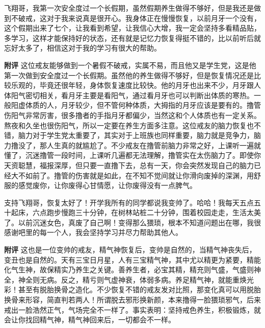 \begin{case}
    飞翔哥，我第一次安全度过一个长假期，虽然假期养生做得不够好，但是我还是做到不破戒，这对于我来说真是很开心。我身体正在慢慢恢复，以前月牙一个没有，这个假期出来了七个，让我看到希望，让我信心大增，我一定会坚持多看精品贴，多学习，这样才能保持好的状态，还有就是记忆力恢复得挺不错的，比以前听后就忘好太多了，相信这对于我的学习有很大的帮助。

    \textbf{附评} 这位戒友能够做到一个暑假不破戒，实属不易，而且他又是学生党，这是他第一次做到安全度过一个长假期。虽然他的养生做得不够好，但是恢复情况还是比较乐观的，毕竟还很年轻，身体恢复速度比较快。他的月牙也出来不少，月牙跟人体阳气密切相关，看月牙主要是看阳气，通过看月牙也可以判断出体质的寒热。一般阳虚体质的人，月牙较少，但不管何种体质，大拇指的月牙应该是要有的。撸管伤阳气非常厉害，很多撸者的手指月牙都偏少，当然这和个人体质也有一定关系。熬夜和久坐也很伤阳气，所以一定要在养生方面多注意。这位戒友的脑力恢复也不错，脑力对于学生党太重要了，其实对于上班族也同样重要，脑力就是竞争力，脑力撸没了，那人生真的就尴尬了。不少戒友在撸管前脑力非常之好，上课听一遍就懂了，沉迷撸管一段时间，上课听几遍都无法理解，撸管实在太伤脑力了。即使你天资聪慧，福报深厚，但只要一直撸下去，总有一天，你会突然发现自己的脑力已经大不如前了。撸管的伤害就是如此，在不知不觉间就让你滑向废掉的深渊，用舒服的感觉废你，让你废得心甘情愿，让你废得没有一点脾气。
\end{case}

\begin{case}
    支持飞翔哥，恢复太好了！开学我所有的同学都说我变帅了。哈哈！我每天五点五十起床，六点跑步慢跑三十分钟，在树林站桩二十分钟，围着校园走走，生活太美了。以前沉迷女色，真废了自己啊！变得那么猥琐，根本不知道问题出在哪，我很感谢吧里的每一个人，我会坚持学习并尽力帮助其他人。

    \textbf{附评} 这也是一位变帅的戒友，精气神恢复后，变帅是自然的，当精气神丧失后，变丑也是自然的。天有三宝日月星，人有三宝精气神，其中尤以精更为紧要，精能化气生神，故保精实乃养生之关键。善养生者，必宝其精，精充则气盛，气盛则神全，神全则无病。反之，精亏则气虚神衰，体弱多病。养足精气神，就能重焕光彩！甚至有脱胎换骨之造化。不少恢复不错的戒友发对比照，那变化真可以用脱胎换骨来形容，简直判若两人！所谓脱去邪形换新颜，本来撸得一脸猥琐邪气，后来戒出一脸浩然正气，气场完全不一样了。事实表明：坚持戒色养生，积极锻炼，就会让你找回精气神，精气神回来后，一切都会不一样。
\end{case}

